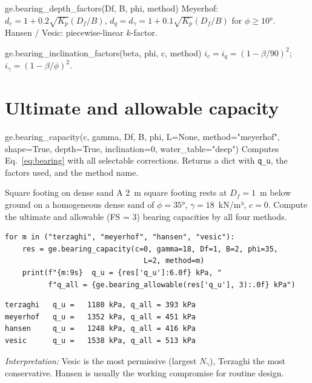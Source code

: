 \documentclass[11pt,a4paper,openany]{book}
\begin{document}
\begin{funcbox}{ge.bearing\_depth\_factors(Df, B, phi, method)}
Meyerhof: $d_c = 1 + 0.2\sqrt{K_p}(D_f/B)$, $d_q = d_\gamma = 1
+ 0.1\sqrt{K_p}(D_f/B)$ for $\phi \geq 10°$.\\
Hansen / Vesic: piecewise-linear $k$-factor.
\end{funcbox}

\begin{funcbox}{ge.bearing\_inclination\_factors(beta, phi, c, method)}
$i_c = i_q = (1 - \beta/90)^2$; $i_\gamma = (1 - \beta/\phi)^2$.
\end{funcbox}

\section{Ultimate and allowable capacity}

\begin{funcbox}{ge.bearing\_capacity(c, gamma, Df, B, phi, L=None, method="meyerhof", shape=True, depth=True, inclination=0, water\_table="deep")}
Computes Eq.~\ref{eq:bearing} with all selectable corrections.
Returns a dict with \texttt{q\_u}, the factors used, and the
method name.
\end{funcbox}

\begin{worked}{Square footing on dense sand}
A 2~m square footing rests at $D_f = 1$~m below ground on a
homogeneous dense sand of $\phi = 35°$, $\gamma = 18$~kN/m³,
$c = 0$. Compute the ultimate and allowable (FS = 3) bearing
capacities by all four methods.
\begin{lstlisting}
for m in ("terzaghi", "meyerhof", "hansen", "vesic"):
    res = ge.bearing_capacity(c=0, gamma=18, Df=1, B=2, phi=35,
                                L=2, method=m)
    print(f"{m:9s}  q_u = {res['q_u']:6.0f} kPa, "
          f"q_all = {ge.bearing_allowable(res['q_u'], 3):.0f} kPa")
\end{lstlisting}
\begin{lstlisting}[style=output]
terzaghi   q_u =   1180 kPa, q_all = 393 kPa
meyerhof   q_u =   1352 kPa, q_all = 451 kPa
hansen     q_u =   1248 kPa, q_all = 416 kPa
vesic      q_u =   1538 kPa, q_all = 513 kPa
\end{lstlisting}
\textit{Interpretation:} Vesic is the most permissive (largest
$N_\gamma$), Terzaghi the most conservative. Hansen is usually
the working compromise for routine design.
\end{worked}
\end{document}
